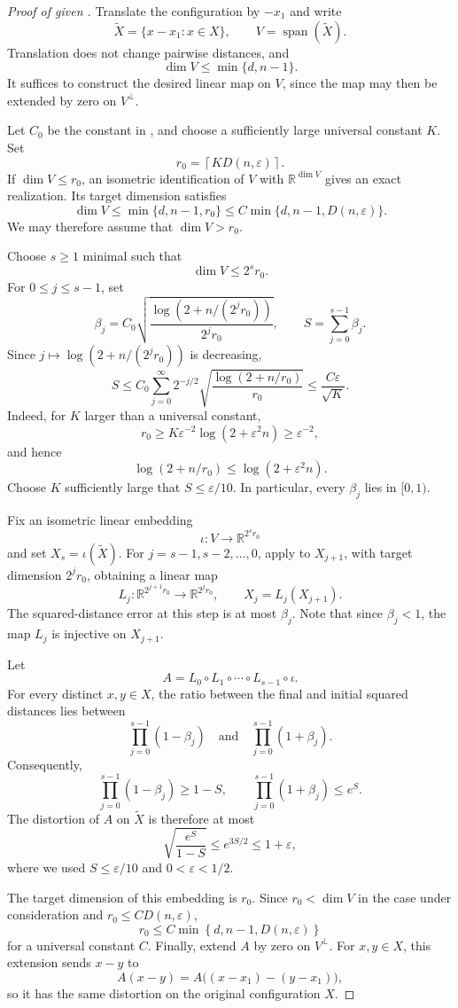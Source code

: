 \documentclass[11pt,reqno,letterpaper]{amsart}
\newcommand{\R}{\mathbb R}
\newcommand{\spann}{\operatorname{span}}
\newcommand{\Dfun}[2]{D(#1,#2)}
\begin{document}
\begin{proof}[Proof of  given ]
Translate the configuration by $-x_1$ and write
\[
 \widetilde X=\{x-x_1:x\in X\},
 \qquad
 V=\spann(\widetilde X).
\]
Translation does not change pairwise distances, and
\[
 \dim V\leq\min\{d,n-1\}.
\]
It suffices to construct the desired linear map on $V$, since the map
may then be extended by zero on $V^\perp$.

Let $C_0$ be the constant in , and choose a
sufficiently large universal constant $K$. Set
\[
 r_0=
 \left\lceil
 K\Dfun{n}{\varepsilon}
 \right\rceil.
\]
If $\dim V\leq r_0$, an isometric identification of $V$ with
$\R^{\dim V}$ gives an exact realization. Its target dimension satisfies
\[
 \dim V\leq\min\{d,n-1,r_0\}
 \leq
 C\min\{d,n-1,\Dfun{n}{\varepsilon}\}.
\]
We may therefore assume that $\dim V>r_0$.

Choose $s\geq1$ minimal such that
\[
 \dim V\leq2^sr_0.
\]
For $0\leq j\leq s-1$, set
\[
 \beta_j
 =
 C_0\sqrt{
 \frac{\log(2+n/(2^jr_0))}{2^jr_0}
 },
 \qquad
 S=\sum_{j=0}^{s-1}\beta_j.
\]
Since $j\mapsto\log(2+n/(2^jr_0))$ is decreasing,
\[
 S
 \leq
 C_0\sum_{j=0}^{\infty}2^{-j/2}
 \sqrt{\frac{\log(2+n/r_0)}{r_0}}
 \leq \frac{C\varepsilon}{\sqrt K}.
\]
Indeed, for $K$ larger than a universal constant,
\[
 r_0
 \geq K\varepsilon^{-2}\log(2+\varepsilon^2n)
 \geq \varepsilon^{-2},
\]
and hence
\[
 \log(2+n/r_0)\leq\log(2+\varepsilon^2n).
\]
Choose $K$ sufficiently large that $S\leq\varepsilon/10$. In
particular, every $\beta_j$ lies in $[0,1)$.

Fix an isometric linear embedding
\[
 \iota:V\longrightarrow\R^{2^sr_0}
\]
and set $X_s=\iota(\widetilde X)$. For
$j=s-1,s-2,\ldots,0$, apply  to $X_{j+1}$, with
target dimension $2^jr_0$, obtaining a linear map
\[
 L_j:\R^{2^{j+1}r_0}\longrightarrow\R^{2^jr_0},
 \qquad
 X_j=L_j(X_{j+1}).
\]
The squared-distance error at this step is at most $\beta_j$. Note that since
$\beta_j<1$, the map $L_j$ is injective on $X_{j+1}$.

Let
\[
 A=L_0\circ L_1\circ\cdots\circ L_{s-1}\circ\iota.
\]
For every distinct $x,y\in X$, the ratio between the final and initial
squared distances lies between
\[
 \prod_{j=0}^{s-1}(1-\beta_j)
 \quad\text{and}\quad
 \prod_{j=0}^{s-1}(1+\beta_j).
\]
Consequently,
\[
 \prod_{j=0}^{s-1}(1-\beta_j)\geq1-S,
 \qquad
 \prod_{j=0}^{s-1}(1+\beta_j)\leq e^S.
\]
The distortion of $A$ on $\widetilde X$ is therefore at most
\[
 \sqrt{\frac{e^S}{1-S}}
 \leq e^{3S/2}
 \leq1+\varepsilon,
\]
where we used $S\leq\varepsilon/10$ and
$0<\varepsilon<1/2$.

The target dimension of this embedding is $r_0$.  Since $r_0<\dim V$ in the case under
consideration and $r_0\leq C\Dfun{n}{\varepsilon}$,
\[
 r_0\leq
 C\min\left\{
 d,n-1,\Dfun{n}{\varepsilon}
 \right\}
\]
for a universal constant $C$.  Finally, extend $A$ by zero on
$V^\perp$.  For $x,y\in X$, this extension sends $x-y$ to
\[
 A(x-y)=A\bigl((x-x_1)-(y-x_1)\bigr),
\]
so it has the same distortion on the original configuration $X$.
\end{proof}
\end{document}
